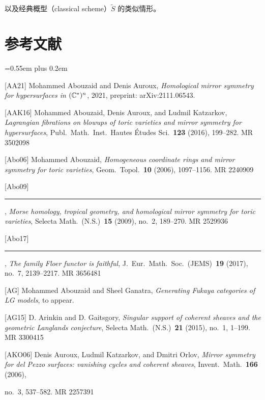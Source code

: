 
以及经典概型（classical scheme）$\tilde S$ 的类似情形。


\section*{参考文献}


\begingroup
\parindent=0pt
\parskip=0.55em plus 0.2em
\raggedright

[AA21] Mohammed Abouzaid and Denis Auroux, \emph{Homological mirror symmetry for
hypersurfaces in $(\mathbb{C}^*)^n$}, 2021, preprint: arXiv:2111.06543.

[AAK16] Mohammed Abouzaid, Denis Auroux, and Ludmil Katzarkov, \emph{Lagrangian
fibrations on blowups of toric varieties and mirror symmetry for hypersurfaces},
Publ.\ Math.\ Inst.\ Hautes \'Etudes Sci.\ \textbf{123} (2016), 199--282.
MR 3502098

[Abo06] Mohammed Abouzaid, \emph{Homogeneous coordinate rings and mirror symmetry for
toric varieties}, Geom.\ Topol.\ \textbf{10} (2006), 1097--1156. MR 2240909

[Abo09] \rule[0.4ex]{2.6em}{0.4pt} , \emph{Morse homology, tropical geometry, and
homological mirror symmetry for toric varieties}, Selecta Math.\ (N.S.)\ \textbf{15}
(2009), no.~2, 189--270. MR 2529936

[Abo17] \rule[0.4ex]{2.6em}{0.4pt} , \emph{The family Floer functor is faithful},
J.\ Eur.\ Math.\ Soc.\ (JEMS)\ \textbf{19} (2017), no.~7, 2139--2217. MR 3656481

[AG] Mohammed Abouzaid and Sheel Ganatra, \emph{Generating Fukaya categories of LG
models}, to appear.

[AG15] D. Arinkin and D. Gaitsgory, \emph{Singular support of coherent sheaves and the
geometric Langlands conjecture}, Selecta Math.\ (N.S.)\ \textbf{21} (2015), no.~1,
1--199. MR 3300415

[AKO06] Denis Auroux, Ludmil Katzarkov, and Dmitri Orlov, \emph{Mirror symmetry for del
Pezzo surfaces: vanishing cycles and coherent sheaves}, Invent.\ Math.\ \textbf{166}
(2006),


no.~3, 537--582. MR 2257391

